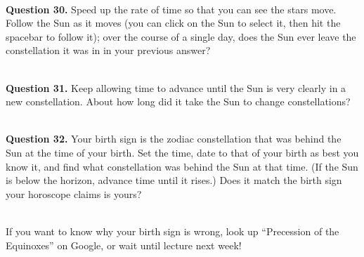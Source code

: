 \documentclass[11pt]{article}
\begin{document}
\hrulefill\\

\newpage

\textbf{Question 30.} Speed up the rate of time so that you can see the stars move. Follow the Sun as it moves (you can click on the Sun to select it, then hit the spacebar to follow it); over the course of a single day, does the Sun ever leave the constellation it was in in your previous answer? \\
\vspace*{1.5cm}

\hrulefill\\

\textbf{Question 31.} Keep allowing time to advance until the Sun is very clearly in a new constellation. About how long did it take the Sun to change constellations? \\
\vspace*{1.5cm}

\hrulefill\\

\textbf{Question 32.} Your birth sign is the zodiac constellation that was behind the Sun at the time of your birth. Set the time, date to that of your birth as best you know it, and find what constellation was behind the Sun at that time. (If the Sun is below the horizon, advance time until it rises.) Does it match the birth sign your horoscope claims is yours?\\
\vspace*{1.5cm}

\hrulefill\\
If you want to know why your birth sign is wrong, look up ``Precession of the Equinoxes'' on Google, or wait until lecture next week!
\end{document}
